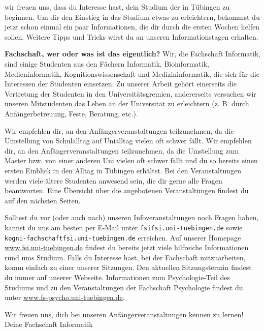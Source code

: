 wir freuen uns, dass du Interesse hast, dein Studium der \studiengang in Tübingen zu beginnen.
Um dir den Einstieg in das Studium etwas zu erleichtern, bekommst du jetzt schon einmal
ein paar Informationen, die dir durch die ersten Wochen helfen sollen.
Weitere Tipps und Tricks wirst du an unseren Informationstagen %
erhalten.

\textbf{\glqq Fachschaft\grqq, wer oder was ist das eigentlich?} Wir, die Fachschaft Informatik, sind einige Studenten aus den Fächern
Informatik, Bioinformatik, Medieninformatik, Kognitionswissenschaft und Medizin\-informatik, die sich für die Interessen der Studenten einsetzen. Zu unserer Arbeit
gehört einerseits die Vertretung der Studenten in den Universitätsgremien, andererseits versuchen wir unseren
Mitstudenten das Leben an der Universität zu erleichtern (z. B. durch Anfängerbetreuung, Feste,
Beratung, etc.).

\ifbachelor 
Wir empfehlen dir, an den Anfängerveranstaltungen teilzunehmen, da die Umstellung von Schulalltag
auf Unialltag vielen oft schwer fällt. 
\fi
\ifmaster
Wir empfehlen dir, an den Anfängerveranstaltungen teilzunehmen, da die Umstellung zum Master bzw. von einer anderen Uni vielen oft schwer fällt und du so bereits einen ersten Einblick in den Alltag in Tübingen erhältst.
\fi 
Bei den Veranstaltungen werden viele ältere Studenten
anwesend sein, die dir gerne alle Fragen beantworten. Eine Übersicht über die angebotenen
Veranstaltungen findest du auf den nächsten Seiten.

Solltest du vor (oder auch nach) unseren Infoveranstaltungen noch Fragen haben, kannst du uns
am besten per E-Mail unter \texttt{fsi\At fsi.uni-tuebingen.de} 
\ifkogwiss
sowie \texttt{kogni-fachschaft\At fsi.uni-tuebingen.de}
\fi
erreichen. Auf unserer Homepage
\url{www.fsi.uni-tuebingen.de} findest du bereits jetzt viele hilfreiche Informationen rund
ums Studium. Falls du Interesse hast, bei der Fachschaft mitzuarbeiten, komm einfach zu einer unserer Sitzungen. Den aktuellen Sitzungstermin findest du immer auf unserer Webseite.
\ifkogwiss  Informationen zum Psychologie-Teil des Studiums und zu den Veranstaltungen der
Fachschaft Psychologie findest du unter \url{www.fs-psycho.uni-tuebingen.de}.\fi

Wir freuen uns, dich bei unseren Anfängerveranstaltungen kennen zu lernen!\\
Deine Fachschaft Informatik
\vfill